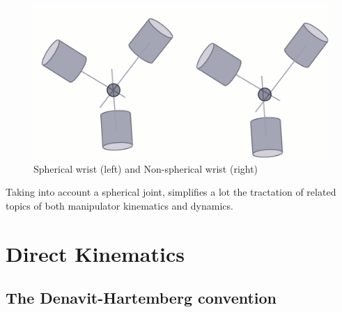 \begin{figure}[h]
    \centering
    \includegraphics[scale=0.4]{img/sph_not_spherical.png}
    \caption{Spherical wrist (left) and Non-spherical wrist (right)}
\end{figure}
Taking into account a spherical joint, simplifies a lot the tractation of related topics of both manipulator kinematics and dynamics.
 
\section{Direct Kinematics}
\subsection{The Denavit-Hartemberg convention}
